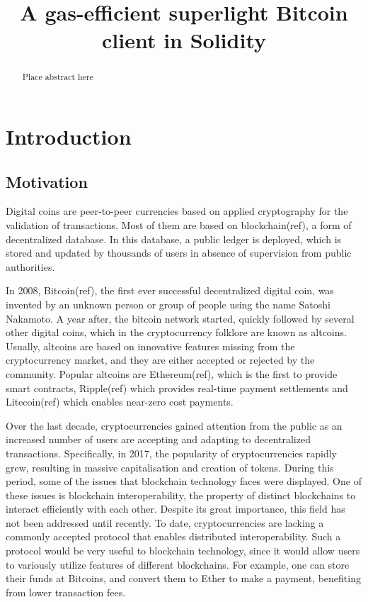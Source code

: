 \documentclass{article}
\title{A gas-efficient superlight Bitcoin client in Solidity}
\begin{document}
  \maketitle

  \begin{abstract}
    Place abstract here
  \end{abstract}

  \section{Introduction}

  \subsection{Motivation}

  Digital coins are peer-to-peer currencies based on applied
  cryptography for the validation of transactions. Most of them are
  based on blockchain(ref), a form of decentralized database. In this
  database, a public ledger is deployed, which is stored and updated by
  thousands of users in absence of supervision from public authorities.

  In 2008, Bitcoin(ref), the first ever successful decentralized digital
  coin, was invented by an unknown person or group of people using the
  name Satoshi Nakamoto. A year after, the bitcoin network started,
  quickly followed by several other digital coins, which in the
  cryptocurrency folklore are known as altcoins. Usually, altcoins are
  based on innovative features missing from the cryptocurrency market,
  and they are either accepted or rejected by the community. Popular
  altcoins are Ethereum(ref), which is the first to provide smart
  contracts, Ripple(ref) which provides real-time payment settlements
  and Litecoin(ref) which enables near-zero cost payments.

  Over the last decade, cryptocurrencies gained attention from the
  public as an increased number of users are accepting and adapting to
  decentralized transactions. Specifically, in 2017, the popularity of
  cryptocurrencies rapidly grew, resulting in massive capitalisation and
  creation of tokens. During this period, some of the issues that
  blockchain technology faces were displayed. One of these issues is
  blockchain interoperability, the property of distinct blockchains to
  interact efficiently with each other. Despite its great importance,
  this field has not been addressed until recently. To date,
  cryptocurrencies are lacking a commonly accepted protocol that enables
  distributed interoperability. Such a protocol would be very useful to
  blockchain technology, since it would allow users to variously utilize
  features of different blockchains. For example, one can store their
  funds at Bitcoins, and convert them to Ether to make a payment,
  benefiting from lower transaction fees.
\end{document}
